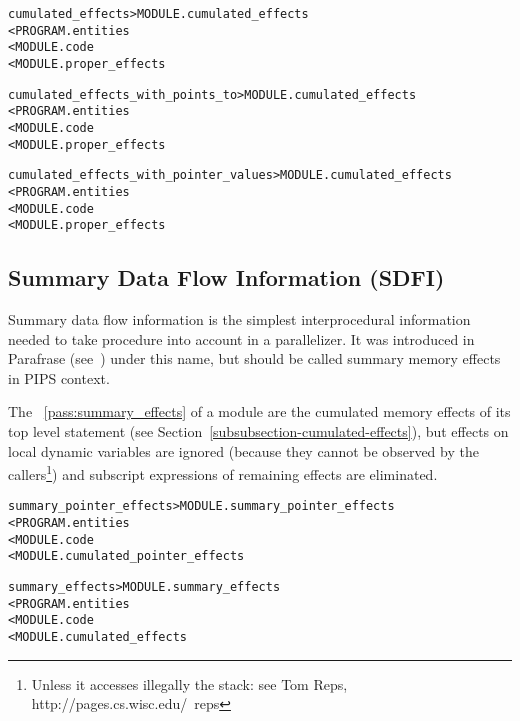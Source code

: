 \documentclass[a4paper]{report}
\newenvironment{PipsMake}{\begin{alltt}}{\end{alltt}}
\newcommand{\PipsPassRef}[1]{\texttt{\detokenize{#1}}~\ref{pass:#1}}
\newenvironment{PipsPass}[1]{\label{pass:#1}}{}
\begin{document}
\begin{PipsMake}
cumulated_effects            > MODULE.cumulated_effects
        < PROGRAM.entities
        < MODULE.code
        < MODULE.proper_effects
\end{PipsMake}

\begin{PipsMake}
cumulated_effects_with_points_to        > MODULE.cumulated_effects
        < PROGRAM.entities
        < MODULE.code
        < MODULE.proper_effects
\end{PipsMake}

\begin{PipsMake}
cumulated_effects_with_pointer_values   > MODULE.cumulated_effects
        < PROGRAM.entities
        < MODULE.code
        < MODULE.proper_effects
\end{PipsMake}

\subsection{Summary Data Flow Information (SDFI)}
\label{subsubection-summary-data-flow-information}

Summary data flow information is the simplest interprocedural
information needed to take procedure into account in a
parallelizer. It was introduced in Parafrase (see~\cite{LY88c}) under
this name, but should be called summary memory effects in PIPS context.

\begin{PipsPass}{summary_effects}
The \PipsPassRef{summary_effects} of a module are the cumulated memory
effects of its
top level statement (see Section~\ref{subsubsection-cumulated-effects}), but effects on local dynamic variables are
ignored (because they cannot be observed by the callers\footnote{Unless
it accesses illegally the stack: see Tom Reps,
http://pages.cs.wisc.edu/~reps}) and subscript expressions of remaining
effects are eliminated.
\end{PipsPass}


\begin{PipsMake}
summary_pointer_effects                 > MODULE.summary_pointer_effects
        < PROGRAM.entities
        < MODULE.code
        < MODULE.cumulated_pointer_effects
\end{PipsMake}

\begin{PipsMake}
summary_effects                 > MODULE.summary_effects
        < PROGRAM.entities
        < MODULE.code
        < MODULE.cumulated_effects
\end{PipsMake}
\end{document}
